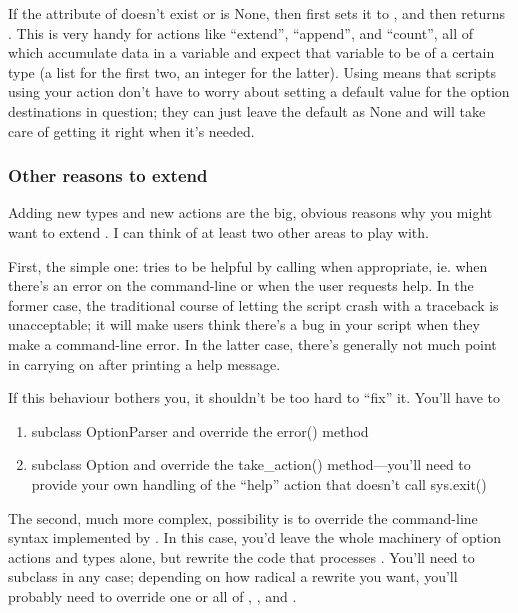 If the  attribute of  doesn't exist or is
None, then  first sets it to , and
then returns . This is very handy for actions like
``extend'', ``append'', and ``count'', all of which accumulate data in
a variable and expect that variable to be of a certain type (a list
for the first two, an integer for the latter).  Using
 means that scripts using your action don't
have to worry about setting a default value for the option
destinations in question; they can just leave the default as None and
 will take care of getting it right when it's
needed.

\subsubsection{Other reasons to extend \label{optparse-extending-other-reasons}}

Adding new types and new actions are the big, obvious reasons why you
might want to extend .  I can think of at least two
other areas to play with.

First, the simple one:  tries to be helpful by
calling  when appropriate, ie. when there's an
error on the command-line or when the user requests help.  In the
former case, the traditional course of letting the script crash with a
traceback is unacceptable; it will make users think there's a bug in
your script when they make a command-line error.  In the latter case,
there's generally not much point in carrying on after printing a help
message.

If this behaviour bothers you, it shouldn't be too hard to ``fix'' it.
You'll have to

\begin{enumerate}
\item subclass OptionParser and override the error() method
\item subclass Option and override the take_action() method---you'll
      need to provide your own handling of the ``help'' action that
      doesn't call sys.exit()
\end{enumerate}

The second, much more complex, possibility is to override the
command-line syntax implemented by .  In this case,
you'd leave the whole machinery of option actions and types alone, but
rewrite the code that processes .  You'll need to
subclass  in any case; depending on how radical a
rewrite you want, you'll probably need to override one or all of
, , and
.

